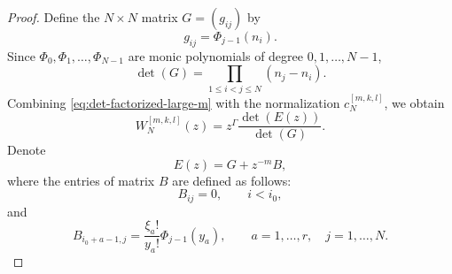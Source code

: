 \documentclass[preprint,3p,10pt]{elsarticle}
\theoremstyle{definition}
\begin{document}
\begin{proof}
Define the $N \times N$ matrix $G=\left(g_{ij}\right)$ by
\begin{equation}
    g_{ij}=\Phi_{j-1}(n_i).
    \label{eq:G-definition-large-m}
\end{equation}
Since \(\Phi_0,\Phi_1,\ldots,\Phi_{N-1}\) are monic polynomials of degree
\(0,1,\ldots,N-1\),
\begin{equation}
    \det \left(G\right)
    =
    \prod_{1\le i<j\le N}(n_j-n_i).
    \label{eq:G-vandermonde-large-m}
\end{equation}
Combining \eqref{eq:det-factorized-large-m} with the normalization
\(c_N^{[m,k,l]}\), we obtain
\begin{equation}
    W_N^{[m,k,l]}(z)
    =
    z^\Gamma\frac{\det \left(E(z)\right)}{\det \left(G\right)}.
    \label{eq:W-normalized-extracted-large-m}
\end{equation}
Denote
\begin{equation}
    E(z)=G+z^{-m}B,
    \label{eq:E-G-B-large-m}
\end{equation}
where the entries of matrix $B$ are defined as follows:
\begin{equation}
    B_{ij}=0,\qquad i<i_0,
\end{equation}
and
\begin{equation}
    B_{i_0+a-1,j}
    =
    \frac{\xi_a!}{y_a!}\Phi_{j-1}(y_a),
    \qquad a=1,\ldots,r,\quad j=1,\ldots,N.
    \label{eq:B-entry-large-m}
\end{equation}


\end{proof}
\end{document}
